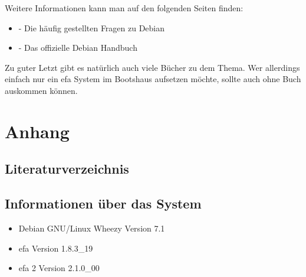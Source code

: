 \documentclass[a4paper,12pt,twoside]{article}
\begin{document}
\bigskip

Weitere Informationen kann man auf den folgenden Seiten finden:

\begin{itemize}
\item \cite{HLP2} - Die häufig gestellten Fragen zu Debian
\item \cite{HLP3} - Das offizielle Debian Handbuch
\end{itemize}

\bigskip

Zu guter Letzt gibt es natürlich auch viele Bücher zu dem Thema. Wer
allerdings einfach nur ein efa System im Bootshaus aufsetzen möchte,
sollte auch ohne Buch auskommen können.


\bigskip

\clearpage\section{Anhang}
\subsection{Literaturverzeichnis}



\bigskip

\subsection{Informationen über das System}
\begin{itemize}
\item Debian GNU/Linux {\textquotedbl}Wheezy{\textquotedbl} Version 7.1
\item efa Version 1.8.3\_19
\item efa 2 Version 2.1.0\_00
\end{itemize}

\bigskip
\end{document}
